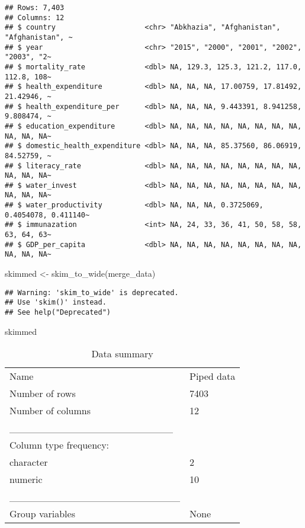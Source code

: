 \documentclass[
]{article}
\newenvironment{Shaded}{\begin{snugshade}}{\end{snugshade}}
\newcommand{\FunctionTok}[1]{\textcolor[rgb]{0.00,0.00,0.00}{#1}}
\newcommand{\NormalTok}[1]{#1}
\newcommand{\OtherTok}[1]{\textcolor[rgb]{0.56,0.35,0.01}{#1}}
\begin{document}
\begin{verbatim}
## Rows: 7,403
## Columns: 12
## $ country                     <chr> "Abkhazia", "Afghanistan", "Afghanistan", ~
## $ year                        <chr> "2015", "2000", "2001", "2002", "2003", "2~
## $ mortality_rate              <dbl> NA, 129.3, 125.3, 121.2, 117.0, 112.8, 108~
## $ health_expenditure          <dbl> NA, NA, NA, 17.00759, 17.81492, 21.42946, ~
## $ health_expenditure_per      <dbl> NA, NA, NA, 9.443391, 8.941258, 9.808474, ~
## $ education_expenditure       <dbl> NA, NA, NA, NA, NA, NA, NA, NA, NA, NA, NA~
## $ domestic_health_expenditure <dbl> NA, NA, NA, 85.37560, 86.06919, 84.52759, ~
## $ literacy_rate               <dbl> NA, NA, NA, NA, NA, NA, NA, NA, NA, NA, NA~
## $ water_invest                <dbl> NA, NA, NA, NA, NA, NA, NA, NA, NA, NA, NA~
## $ water_productivity          <dbl> NA, NA, NA, 0.3725069, 0.4054078, 0.411140~
## $ immunazation                <int> NA, 24, 33, 36, 41, 50, 58, 58, 63, 64, 63~
## $ GDP_per_capita              <dbl> NA, NA, NA, NA, NA, NA, NA, NA, NA, NA, NA~
\end{verbatim}

\begin{Shaded}
\begin{Highlighting}[]
\NormalTok{skimmed }\OtherTok{\textless{}{-}} \FunctionTok{skim\_to\_wide}\NormalTok{(merge\_data)}
\end{Highlighting}
\end{Shaded}

\begin{verbatim}
## Warning: 'skim_to_wide' is deprecated.
## Use 'skim()' instead.
## See help("Deprecated")
\end{verbatim}

\begin{Shaded}
\begin{Highlighting}[]
\NormalTok{skimmed}
\end{Highlighting}
\end{Shaded}

\begin{longtable}[]{@{}ll@{}}
\caption{Data summary}\tabularnewline
\toprule()
\endhead
Name & Piped data \\
Number of rows & 7403 \\
Number of columns & 12 \\
\_\_\_\_\_\_\_\_\_\_\_\_\_\_\_\_\_\_\_\_\_\_\_ & \\
Column type frequency: & \\
character & 2 \\
numeric & 10 \\
\_\_\_\_\_\_\_\_\_\_\_\_\_\_\_\_\_\_\_\_\_\_\_\_ & \\
Group variables & None \\
\bottomrule()
\end{longtable}
\end{document}
